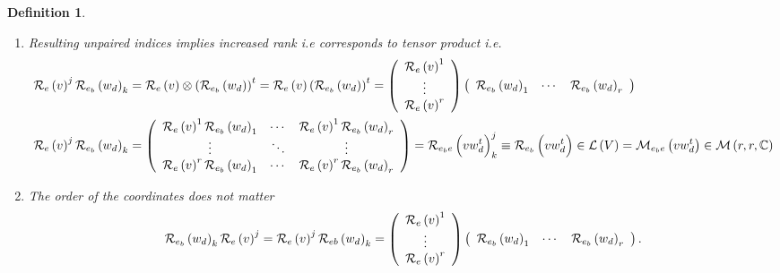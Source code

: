 \documentclass[aps,preprint]{revtex4}%
\newtheorem{definition}[theorem]{Definition}
\begin{document}
\begin{definition}
\begin{enumerate}
\item Resulting unpaired indices implies increased rank i.e corresponds to
tensor product i.e.
\begin{align}
\mathcal{R}_{e}\left(  v\right)  ^{j}\mathcal{R}_{e_{b}}\left(  w_{d}\right)
_{k}  &  =\mathcal{R}_{e}\left(  v\right)  \otimes\left(  \mathcal{R}_{e_{b}%
}\left(  w_{d}\right)  \right)  ^{t}=\mathcal{R}_{e}\left(  v\right)  \left(
\mathcal{R}_{e_{b}}\left(  w_{d}\right)  \right)  ^{t}=\left(
\begin{array}
[c]{c}%
\mathcal{R}_{e}\left(  v\right)  ^{1}\\
\vdots\\
\mathcal{R}_{e}\left(  v\right)  ^{r}%
\end{array}
\right)  \left(
\begin{array}
[c]{ccc}%
\mathcal{R}_{e_{b}}\left(  w_{d}\right)  _{1} & \cdots & \mathcal{R}_{e_{b}%
}\left(  w_{d}\right)  _{r}%
\end{array}
\right) \\
\mathcal{R}_{e}\left(  v\right)  ^{j}\mathcal{R}_{e_{b}}\left(  w_{d}\right)
_{k}  &  =\left(
\begin{array}
[c]{ccc}%
\mathcal{R}_{e}\left(  v\right)  ^{1}\mathcal{R}_{e_{b}}\left(  w_{d}\right)
_{1} & \cdots & \mathcal{R}_{e}\left(  v\right)  ^{1}\mathcal{R}_{e_{b}%
}\left(  w_{d}\right)  _{r}\\
\vdots & \ddots & \vdots\\
\mathcal{R}_{e}\left(  v\right)  ^{r}\mathcal{R}_{e_{b}}\left(  w_{d}\right)
_{1} & \cdots & \mathcal{R}_{e}\left(  v\right)  ^{r}\mathcal{R}_{e_{b}%
}\left(  w_{d}\right)  _{r}%
\end{array}
\right)  =\mathcal{R}_{e_{b}e}\left(  \overset{}{vw_{d}^{t}}\right)  _{k}%
^{j}\equiv\mathcal{R}_{e_{b}}\left(  \overset{}{vw_{d}^{t}}\right)
\in\mathcal{L}\left(  V\right)  =\mathcal{M}_{e_{b}e}\left(  vw_{d}%
^{t}\right)  \in\mathcal{M}\left(  r,r,\mathbb{C}\right)
\end{align}


\item The order of the coordinates does not matter%
\begin{equation}
\mathcal{R}_{e_{b}}\left(  w_{d}\right)  _{k}\mathcal{R}_{e}\left(  v\right)
^{j}=\mathcal{R}_{e}\left(  v\right)  ^{j}\mathcal{R}_{eb}\left(
w_{d}\right)  _{k}=\left(
\begin{array}
[c]{c}%
\mathcal{R}_{e}\left(  v\right)  ^{1}\\
\vdots\\
\mathcal{R}_{e}\left(  v\right)  ^{r}%
\end{array}
\right)  \left(
\begin{array}
[c]{ccc}%
\mathcal{R}_{e_{b}}\left(  w_{d}\right)  _{1} & \cdots & \mathcal{R}_{e_{b}%
}\left(  w_{d}\right)  _{r}%
\end{array}
\right)  .
\end{equation}

\end{enumerate}
\end{definition}
\end{document}
